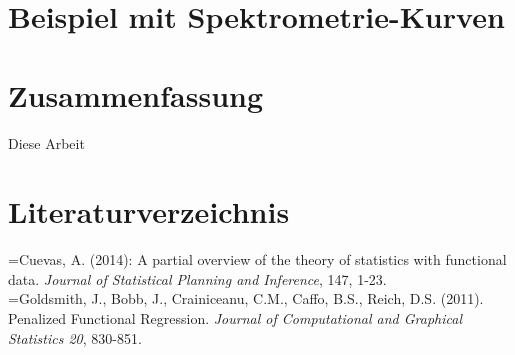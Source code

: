 \documentclass[a4paper,ngerman,oneside,titlepage,11pt]{scrreprt}
\theoremstyle{remark}
\begin{document}
\chapter{Beispiel mit Spektrometrie-Kurven}

\chapter{Zusammenfassung}

Diese Arbeit 

 



% 
% 
% 
% 
%


\chapter*{Literaturverzeichnis}

\noindent \hangindent=\parindent [Cue14] Cuevas, A. (2014): A partial overview of the theory of statistics with functional data. \textit{Journal of Statistical Planning and Inference}, 147, 1-23.\\

\noindent \hangindent=\parindent [GBC+11] Goldsmith, J., Bobb, J., Crainiceanu, C.M., Caffo, B.S., Reich, D.S. (2011). Penalized Functional Regression. \textit{Journal of Computational and Graphical Statistics 20}, 830-851.\\
\end{document}
